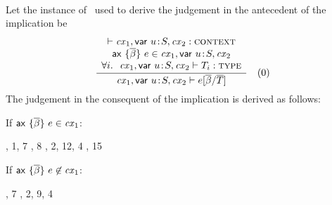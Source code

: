 \begin{bycase}
\Case{\Rthax}\\
Let the instance of \Rthax\ used to derive the judgement in the antecedent of
the implication be
\[
\rruleIII
 {\cxwf{\cxv}}
 {\axO\in\cxv}
 {\FORALL{i}{\isty{\cxv}{\typ_i}}}
 {\theo{\cxv}{\tsbslash{\expr}{\tvarS}{\typS}}}
 {0}
\]
The judgement in the consequent of the implication is derived as follows:
\begin{derivation}
\end{derivation}
If $\mathsf{ax}\ \{\overline{\beta}\}\ e\in\mathit{cx}_1$:
\begin{derivatioN}{6}
     {, 1, 7}
     {, 8}
\step{\theo{\cxvI}{\tsbslash{\expr}{\tvarS}{\typS}}}
     {\Rthax, 2, 12, 4}
\step{\efvar{\tsbslash{\expr}{\tvarS}{\typS}}=\efvar{\expr}}
     {}
\step{\esbsren{\tsbslash{\expr}{\tvarS}{\typS}}=\tsbslash{\expr}{\tvarS}{\typS}}
     {, 15}
\end{derivatioN}
If $\mathsf{ax}\ \{\overline{\beta}\}\ e\not\in\mathit{cx}_1$:
\begin{derivatioN}{6}
     {, 7}
\step{\theo{\cxvI}{\tsbslash{\esbsren{\expr}}{\tvarS}{\typS}}}
     {\Rthax, 2, 9, 4}
\step{\tsbslash{\esbsren{\expr}}{\tvarS}{\typS}=
      \esbsren{\tsbslash{\expr}{\tvarS}{\typS}}}
     {}
\end{derivatioN}


\end{bycase}
